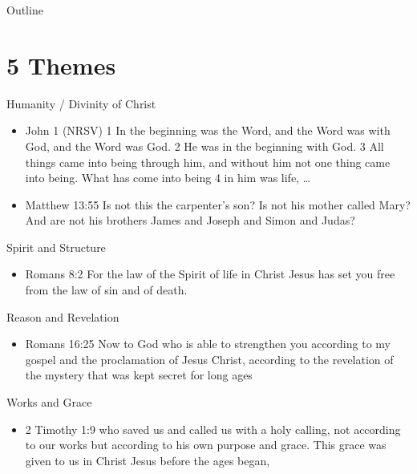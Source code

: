 

\maketitle
\begin{frame}{Outline}
\setcounter{tocdepth}{1}
\tableofcontents
\end{frame}


\section{5 Themes}
\label{sec-1}
\begin{frame}[label=sec-1-1]{Humanity / Divinity of Christ}
\begin{itemize}
\item John 1  (NRSV) 1 In the beginning was the Word, and the Word was with God, and the Word was God. 2 He was in the beginning with God. 3 All things came into being through him, and without him not one thing came into being. What has come into being 4 in him was life, \ldots{}
\item Matthew 13:55 Is not this the carpenter’s son? Is not his mother called Mary? And are not his brothers James and Joseph and Simon and Judas?
\end{itemize}
\end{frame}

\begin{frame}[label=sec-1-2]{Spirit and Structure}
\begin{itemize}
\item Romans 8:2 For the law of the Spirit of life in Christ Jesus has set you free from the law of sin and of death.
\end{itemize}
\end{frame}

\begin{frame}[label=sec-1-3]{Reason and Revelation}
\begin{itemize}
\item Romans 16:25  Now to God who is able to strengthen you according to my gospel and the proclamation of Jesus Christ, according to the revelation of the mystery that was kept secret for long ages
\end{itemize}
\end{frame}

\begin{frame}[label=sec-1-4]{Works and Grace}
\begin{itemize}
\item 2 Timothy 1:9 who saved us and called us with a holy calling, not according to our works but according to his own purpose and grace. This grace was given to us in Christ Jesus before the ages began,
\end{itemize}
\end{frame}

